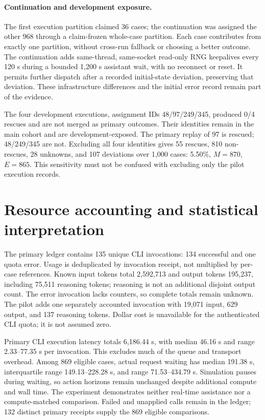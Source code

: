 \paragraph{Continuation and development exposure.}
The first execution partition claimed 36 cases; the continuation was assigned the other 968 through a claim-frozen whole-case partition. Each case contributes from exactly one partition, without cross-run fallback or choosing a better outcome. The continuation adds same-thread, same-socket read-only RNG keepalives every 120 s during a bounded 1,200 s assistant wait, with no reconnect or reset. It permits further dispatch after a recorded initial-state deviation, preserving that deviation. These infrastructure differences and the initial error record remain part of the evidence.

The four development executions, assignment IDs 48/97/249/345, produced 0/4 rescues and are not merged as primary outcomes. Their identities remain in the main cohort and are development-exposed. The primary replay of 97 is rescued; 48/249/345 are not. Excluding all four identities gives 55 rescues, 810 non-rescues, 28 unknowns, and 107 deviations over 1,000 cases: 5.50\%, $M=870$, $E=865$. This sensitivity must not be confused with excluding only the pilot execution records.

\section{Resource accounting and statistical interpretation}
\label{s:statistics}
The primary ledger contains 135 unique CLI invocations: 134 successful and one quota error. Usage is deduplicated by invocation receipt, not multiplied by per-case references. Known input tokens total 2,592,713 and output tokens 195,237, including 75,511 reasoning tokens; reasoning is not an additional disjoint output count. The error invocation lacks counters, so complete totals remain unknown. The pilot adds one separately accounted invocation with 19,071 input, 629 output, and 137 reasoning tokens. Dollar cost is unavailable for the authenticated CLI quota; it is not assumed zero.

Primary CLI execution latency totals 6,186.44 s, with median 46.16 s and range 2.33--77.35 s per invocation. This excludes much of the queue and transport overhead. Among 869 eligible cases, actual request waiting has median 191.38 s, interquartile range 149.13--228.28 s, and range 71.53--434.79 s. Simulation pauses during waiting, so action horizons remain unchanged despite additional compute and wall time. The experiment demonstrates neither real-time assistance nor a compute-matched comparison. Failed and unapplied calls remain in the ledger; 132 distinct primary receipts supply the 869 eligible comparisons.

